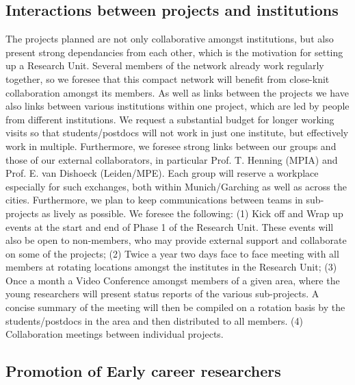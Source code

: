 \documentclass[10pt,fleqn,twoside]{article}
\begin{document}
\subsection{Interactions between projects and institutions}

\noindent The projects planned are not only collaborative amongst institutions,
but also present strong dependancies from each other, which is the
motivation for setting up a Research Unit. Several members of the
network already work regularly together, so we foresee that this compact
network will benefit from close-knit collaboration amongst its members.
As well as links between the projects we have also links between
various institutions within one project, which are led by people from
different institutions. We request a substantial budget for longer
working visits so that students/postdocs will not work in just one
institute, but effectively work in multiple. Furthermore, we foresee
strong links between our groups and those of our external
collaborators, in particular Prof. T. Henning (MPIA) and Prof. E. van
Dishoeck (Leiden/MPE). Each group will reserve a workplace especially for such exchanges, both within Munich/Garching as well as across the cities. 
Furthermore, we plan to keep communications between teams in
sub-projects as lively as possible. We foresee the following: (1) Kick
off and Wrap up events at the start and end of Phase 1 of the Research
Unit. These events will also be open to non-members, who may provide
external support and collaborate on some of the projects; (2) Twice a
year two days face to face meeting with all members at rotating
locations amongst the institutes in the Research Unit; (3) Once a
month a Video Conference amongst members of a given area, where the young
researchers will present status reports of the various sub-projects. A
concise summary of the meeting will then be compiled on a rotation
basis by the students/postdocs in the area and then distributed to
all members. (4) Collaboration meetings between individual projects.

\subsection{Promotion of Early career researchers}
\end{document}
